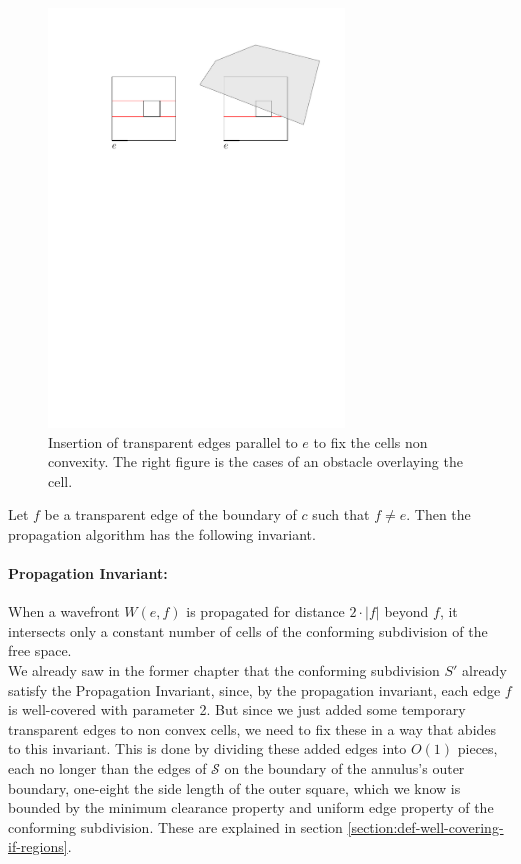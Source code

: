 \begin{figure}[H]
	\centering
	\includegraphics[width=0.7\textwidth]{figures/preparingcells.pdf}
	\caption{Insertion of transparent edges parallel to $e$ to fix the cells non convexity. The right 
    		 figure is the cases of an obstacle overlaying the cell\cite{HershbergerS99}.}
	\label{fig:preparingcells}
\end{figure}

Let $f$ be a transparent edge of the boundary of $c$ such that $f \neq e$. Then the propagation algorithm has 
the following invariant.

\paragraph{Propagation Invariant:} When a wavefront $W(e,f)$ is propagated for distance $2 \cdot | f |$
           beyond $f$, it intersects only a constant number of cells of the conforming subdivision 
           of the free space.  \\

We already saw in the former chapter that the conforming subdivision $S'$ already satisfy the Propagation 
Invariant, since, by the propagation invariant, each edge $f$ is well-covered with parameter 2. But since we 
just added some temporary transparent edges to non convex cells, we need to fix these in a way that abides to 
this invariant. This is done by dividing these added edges into $O(1)$ pieces, each no longer than the edges 
of $\mathcal{S}$ on the boundary of the annulus's outer boundary, one-eight the side length of the outer 
square, which we know is bounded by the minimum clearance property and uniform edge property of the conforming 
subdivision. These are explained in section \ref{section:def-well-covering-if-regions}. 

